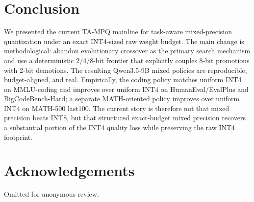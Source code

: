 \documentclass{article}
\newcommand{\method}{TA-MPQ}
\begin{document}
\section{Conclusion}

We presented the current \method{} mainline for task-aware mixed-precision quantization under an exact INT4-sized raw weight budget. The main change is methodological: abandon evolutionary crossover as the primary search mechanism and use a deterministic 2/4/8-bit frontier that explicitly couples 8-bit promotions with 2-bit demotions. The resulting Qwen3.5-9B mixed policies are reproducible, budget-aligned, and real. Empirically, the coding policy matches uniform INT4 on MMLU-coding and improves over uniform INT4 on HumanEval/EvalPlus and BigCodeBench-Hard; a separate MATH-oriented policy improves over uniform INT4 on MATH-500 last100. The current story is therefore not that mixed precision beats INT8, but that structured exact-budget mixed precision recovers a substantial portion of the INT4 quality loss while preserving the raw INT4 footprint.

\section*{Acknowledgements}

Omitted for anonymous review.



\end{document}
